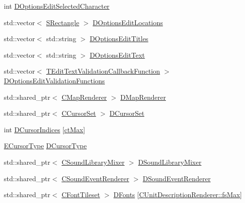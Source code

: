 \begin{DoxyCompactItemize}
\item 
int \hyperlink{classCApplicationData_a921d69021fc61e51d12d8a26a5ac1a89}{D\+Options\+Edit\+Selected\+Character}
\item 
std\+::vector$<$ \hyperlink{structSRectangle}{S\+Rectangle} $>$ \hyperlink{classCApplicationData_ab4e6804c6e50cca45ab3c3071588da34}{D\+Options\+Edit\+Locations}
\item 
std\+::vector$<$ std\+::string $>$ \hyperlink{classCApplicationData_a7a322ef6b8c1db3e995c6b493230fd05}{D\+Options\+Edit\+Titles}
\item 
std\+::vector$<$ std\+::string $>$ \hyperlink{classCApplicationData_a7044dc34cbd9d6776e8ef79eb12b5ce4}{D\+Options\+Edit\+Text}
\item 
std\+::vector$<$ \hyperlink{main_8cpp_a1f079840d4510b96faa423932bed3af0}{T\+Edit\+Text\+Validation\+Callback\+Function} $>$ \hyperlink{classCApplicationData_ab76fa444142de66fdb058f390e01112c}{D\+Options\+Edit\+Validation\+Functions}
\item 
std\+::shared\+\_\+ptr$<$ \hyperlink{classCMapRenderer}{C\+Map\+Renderer} $>$ \hyperlink{classCApplicationData_afaf62b458bd7a0ec93ab9f063d7ea8d7}{D\+Map\+Renderer}
\item 
std\+::shared\+\_\+ptr$<$ \hyperlink{classCCursorSet}{C\+Cursor\+Set} $>$ \hyperlink{classCApplicationData_aab67bfc9fa6708d7900ff654f9da05c7}{D\+Cursor\+Set}
\item 
int \hyperlink{classCApplicationData_a3f4e69d928f933bba6e1c388c5a720a2}{D\+Cursor\+Indices} \mbox{[}\hyperlink{classCApplicationData_ad024b66b60017c45c47a85dbc636ae69a57f089bfb5f201e4f592dd2e41888a44}{ct\+Max}\mbox{]}
\item 
\hyperlink{classCApplicationData_ad024b66b60017c45c47a85dbc636ae69}{E\+Cursor\+Type} \hyperlink{classCApplicationData_a931cfbda23231fb441081f231326e7ee}{D\+Cursor\+Type}
\item 
std\+::shared\+\_\+ptr$<$ \hyperlink{classCSoundLibraryMixer}{C\+Sound\+Library\+Mixer} $>$ \hyperlink{classCApplicationData_aa1e6876121bb4fb229ec6b930a8a6766}{D\+Sound\+Library\+Mixer}
\item 
std\+::shared\+\_\+ptr$<$ \hyperlink{classCSoundEventRenderer}{C\+Sound\+Event\+Renderer} $>$ \hyperlink{classCApplicationData_af2959556fc881145d9d777c627a9345d}{D\+Sound\+Event\+Renderer}
\item 
std\+::shared\+\_\+ptr$<$ \hyperlink{classCFontTileset}{C\+Font\+Tileset} $>$ \hyperlink{classCApplicationData_afde9247d0a3ea87393ec86dcdb1e8274}{D\+Fonts} \mbox{[}\hyperlink{classCUnitDescriptionRenderer_a3ea4cd83b6dd9533ab3abb953a7da35aa74218e4708bac1eab359099eb0b159b2}{C\+Unit\+Description\+Renderer\+::fs\+Max}\mbox{]}

\end{DoxyCompactItemize}
